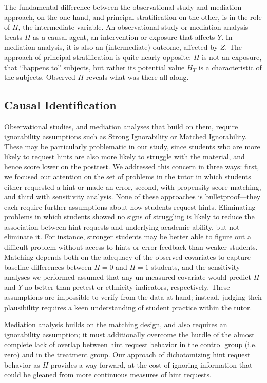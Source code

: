 \documentclass{article}\usepackage[]{graphicx}\usepackage[]{color}
\begin{document}
The fundamental difference between the observational study and
mediation approach, on the one hand, and principal stratification on
the other, is in the role of $H$, the intermediate variable.
An observational study or mediation analysis treats $H$ as a causal
agent, an intervention or exposure that affects $Y$.
In mediation analysis, it is also an (intermediate) outcome, affected
by $Z$.
The approach of principal stratification is quite nearly opposite:
$H$ is not an exposure, that ``happens to'' subjects, but rather its
potential value $H_T$ is a characteristic of the subjects.
Observed $H$ reveals what was there all along.


\subsection{Causal Identification}

Observational studies, and mediation analyses that build on them,
require ignorability assumptions such as Strong Ignorability or
Matched Ignorability.
These may be particularly problematic in our study, since students who
are more likely to request hints are also more likely to struggle with
the material, and hence score lower on the posttest.
We addressed this concern in three ways: first, we focused our attention
on the set of problems in the tutor in which students either requested
a hint or made an error, second, with propensity score matching, and
third with sensitivity analysis.
None of these approaches is bulletproof---they each require further
assumptions about how students request hints.
Eliminating problems in which students showed no signs of struggling
is likely to reduce the association between hint requests and
underlying academic ability, but not eliminate it.
For instance, stronger students may be better able to figure out a
difficult problem without access to hints or error feedback than
weaker students.
Matching depends both on the adequacy of the observed covariates to
capture baseline differences between $H=0$ and $H=1$ students, and the
sensitivity analyses we performed assumed that any un-measured
covariate would predict $H$ and $Y$ no better than pretest or ethnicity indicators, respectively.
These assumptions are impossible to verify from the data at hand;
instead, judging their plausibility requires a keen understanding of student practice within
the tutor.

Mediation analysis builds on the matching design, and also requires an
ignorability assumption; it must
additionally overcome the hurdle of the almost complete lack of
overlap between hint request behavior in the control group (i.e. zero)
and in the treatment group.
Our approach of dichotomizing hint request behavior as $H$ provides a
way forward, at the cost of ignoring information that could be gleaned
from more continuous measures of hint requests.
\end{document}
